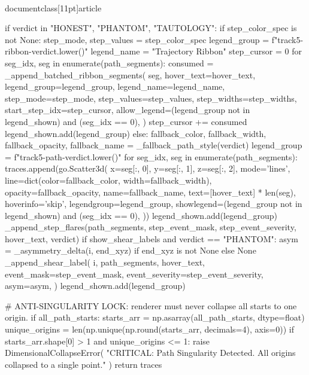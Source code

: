 \\documentclass[11pt]{article}
\begin{document}
\begin{CodeBlock}
{{        if verdict in {"HONEST", "PHANTOM", "TAUTOLOGY"}:
            if step_color_spec is not None:
                step_mode, step_values = step_color_spec
                legend_group = f"track5-ribbon-{verdict.lower()}"
                legend_name = "Trajectory Ribbon"
                step_cursor = 0
                for seg_idx, seg in enumerate(path_segments):
                    consumed = _append_batched_ribbon_segments(
                        seg,
                        hover_text=hover_text,
                        legend_group=legend_group,
                        legend_name=legend_name,
                        step_mode=step_mode,
                        step_values=step_values,
                        step_widths=step_widths,
                        start_step_idx=step_cursor,
                        allow_legend=(legend_group not in legend_shown) and (seg_idx == 0),
                    )
                    step_cursor += consumed
                legend_shown.add(legend_group)
            else:
                fallback_color, fallback_width, fallback_opacity, fallback_name = _fallback_path_style(verdict)
                legend_group = f"track5-path-{verdict.lower()}"
                for seg_idx, seg in enumerate(path_segments):
                    traces.append(go.Scatter3d(
                        x=seg[:, 0],
                        y=seg[:, 1],
                        z=seg[:, 2],
                        mode='lines',
                        line=dict(color=fallback_color, width=fallback_width),
                        opacity=fallback_opacity,
                        name=fallback_name,
                        text=[hover_text] * len(seg),
                        hoverinfo='skip',
                        legendgroup=legend_group,
                        showlegend=(legend_group not in legend_shown) and (seg_idx == 0),
                    ))
                legend_shown.add(legend_group)
            _append_step_flares(path_segments, step_event_mask, step_event_severity, hover_text, verdict)
            if show_shear_labels and verdict == "PHANTOM":
                asym = _asymmetry_delta(i, end_xyz) if end_xyz is not None else None
                _append_shear_label(
                    i,
                    path_segments,
                    hover_text,
                    event_mask=step_event_mask,
                    event_severity=step_event_severity,
                    asym=asym,
                )
            legend_shown.add(legend_group)

    # ANTI-SINGULARITY LOCK: renderer must never collapse all starts to one origin.
    if all_path_starts:
        starts_arr = np.asarray(all_path_starts, dtype=float)
        unique_origins = len(np.unique(np.round(starts_arr, decimals=4), axis=0))
        if starts_arr.shape[0] > 1 and unique_origins <= 1:
            raise DimensionalCollapseError(
                "CRITICAL: Path Singularity Detected. All origins collapsed to a single point."
            )
    return traces


}}
\end{CodeBlock}
\end{document}
